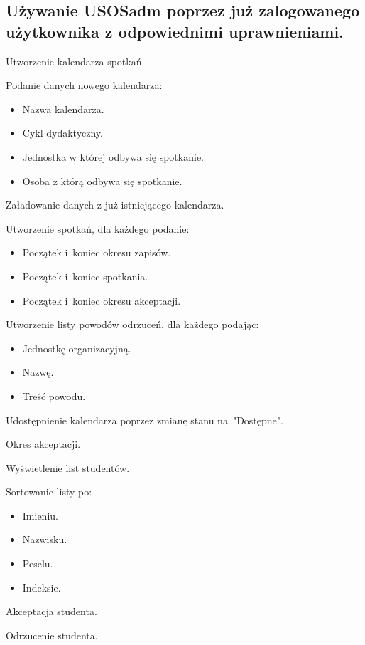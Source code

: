 \documentclass[licencjacka]{pracamgr}
\begin{document}
\subsection{Używanie USOSadm poprzez już zalogowanego użytkownika z odpowiednimi uprawnieniami.}
	\begin{step}
		\item Utworzenie kalendarza spotkań.
			\begin{step}
				\item Podanie danych nowego kalendarza:
					\begin{itemize}
						\item Nazwa kalendarza.
						\item Cykl dydaktyczny.
						\item Jednostka w której odbywa się spotkanie.
						\item Osoba z którą odbywa się spotkanie.
					\end{itemize} 
				\item Załadowanie danych z już istniejącego kalendarza.
			\end{step}
				\item Utworzenie spotkań, dla każdego podanie:
					\begin{itemize}
						\item Początek i~koniec okresu zapisów.
						\item Początek i~koniec spotkania.
						\item Początek i~koniec okresu akceptacji.
					\end{itemize}
				\item Utworzenie listy powodów odrzuceń, dla każdego podając:
					\begin{itemize}
						\item Jednostkę organizacyjną.
						\item Nazwę.
						\item Treść powodu.
					\end{itemize}
		\item Udostępnienie kalendarza poprzez zmianę stanu na~"Dostępne".
		\item Okres akceptacji.
			\begin{step}
				\item Wyświetlenie list studentów.
					\begin{step}
						\item Sortowanie listy po:
							\begin{itemize}
								\item Imieniu.
								\item Nazwisku.
								\item Peselu.
								\item Indeksie.
						 	\end{itemize}
					\end{step}
				\item Akceptacja studenta.
				\item Odrzucenie studenta. 
			\end{step}
	\end{step}
	
\end{document}
